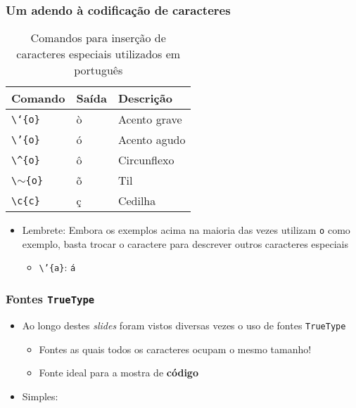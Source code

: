 \begin{frame}[fragile] \frametitle{Um adendo à codificação de caracteres}
\begin{table}[!t]
\caption{Comandos para inserção de caracteres especiais utilizados em português}
\begin{tabular}{l|l|l} \hline
\textbf{Comando} & \textbf{Saída} & \textbf{Descrição} \\ \hline
\texttt{\textbackslash{}`\{o\}}                  & ò & Acento grave \\ \hline
\texttt{\textbackslash{}'\{o\}}                  & ó & Acento agudo \\ \hline
\texttt{\textbackslash{}\textasciicircum{}\{o\}} & ô & Circunflexo  \\ \hline
\texttt{\textbackslash{}$\sim$\{o\}}             & õ & Til          \\ \hline
\texttt{\textbackslash{}c\{c\}}                  & ç & Cedilha      \\ \hline
\end{tabular}
\end{table}

\begin{itemize}
	\item Lembrete: Embora os exemplos acima na maioria das vezes utilizam \texttt{o} como exemplo, basta trocar o caractere para descrever outros caracteres especiais
	\begin{itemize}
		\item \texttt{\textbackslash{}'\{a\}}: \texttt{á}
	\end{itemize}
\end{itemize}
\end{frame}

\begin{frame}[fragile] \frametitle{Fontes \texttt{TrueType}}
\begin{itemize}
	\item Ao longo destes \textit{slides} foram vistos diversas vezes o uso de fontes \texttt{TrueType}
	\begin{itemize}
		\item Fontes as quais todos os caracteres ocupam o mesmo tamanho!
		\item Fonte ideal para a mostra de \textbf{código}
	\end{itemize}
	\item Simples: 
\end{itemize}
\end{frame}


